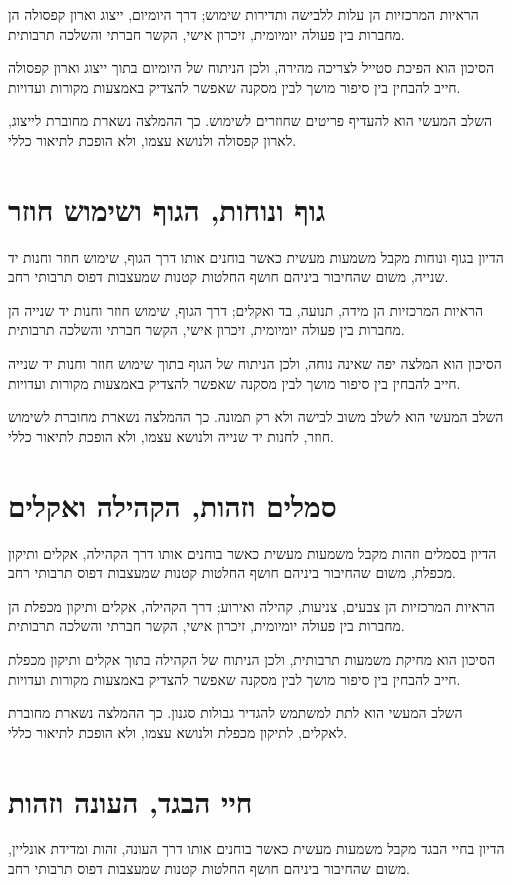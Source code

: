הראיות המרכזיות הן עלות ללבישה ותדירות שימוש; דרך היומיום, ייצוג וארון קפסולה הן מחברות בין פעולה יומיומית, זיכרון אישי, הקשר חברתי והשלכה תרבותית.

הסיכון הוא הפיכת סטייל לצריכה מהירה, ולכן הניתוח של היומיום בתוך ייצוג וארון קפסולה חייב להבחין בין סיפור מושך לבין מסקנה שאפשר להצדיק באמצעות מקורות ועדויות.

השלב המעשי הוא להעדיף פריטים שחוזרים לשימוש. כך ההמלצה נשארת מחוברת לייצוג, לארון קפסולה ולנושא עצמו, ולא הופכת לתיאור כללי.

\section{גוף ונוחות, הגוף ושימוש חוזר}
הדיון בגוף ונוחות מקבל משמעות מעשית כאשר בוחנים אותו דרך הגוף, שימוש חוזר וחנות יד שנייה, משום שהחיבור ביניהם חושף החלטות קטנות שמעצבות דפוס תרבותי רחב.

הראיות המרכזיות הן מידה, תנועה, בד ואקלים; דרך הגוף, שימוש חוזר וחנות יד שנייה הן מחברות בין פעולה יומיומית, זיכרון אישי, הקשר חברתי והשלכה תרבותית.

הסיכון הוא המלצה יפה שאינה נוחה, ולכן הניתוח של הגוף בתוך שימוש חוזר וחנות יד שנייה חייב להבחין בין סיפור מושך לבין מסקנה שאפשר להצדיק באמצעות מקורות ועדויות.

השלב המעשי הוא לשלב משוב לבישה ולא רק תמונה. כך ההמלצה נשארת מחוברת לשימוש חוזר, לחנות יד שנייה ולנושא עצמו, ולא הופכת לתיאור כללי.

\section{סמלים וזהות, הקהילה ואקלים}
הדיון בסמלים וזהות מקבל משמעות מעשית כאשר בוחנים אותו דרך הקהילה, אקלים ותיקון מכפלת, משום שהחיבור ביניהם חושף החלטות קטנות שמעצבות דפוס תרבותי רחב.

הראיות המרכזיות הן צבעים, צניעות, קהילה ואירוע; דרך הקהילה, אקלים ותיקון מכפלת הן מחברות בין פעולה יומיומית, זיכרון אישי, הקשר חברתי והשלכה תרבותית.

הסיכון הוא מחיקת משמעות תרבותית, ולכן הניתוח של הקהילה בתוך אקלים ותיקון מכפלת חייב להבחין בין סיפור מושך לבין מסקנה שאפשר להצדיק באמצעות מקורות ועדויות.

השלב המעשי הוא לתת למשתמש להגדיר גבולות סגנון. כך ההמלצה נשארת מחוברת לאקלים, לתיקון מכפלת ולנושא עצמו, ולא הופכת לתיאור כללי.

\section{חיי הבגד, העונה וזהות}
הדיון בחיי הבגד מקבל משמעות מעשית כאשר בוחנים אותו דרך העונה, זהות ומדידת אונליין, משום שהחיבור ביניהם חושף החלטות קטנות שמעצבות דפוס תרבותי רחב.

